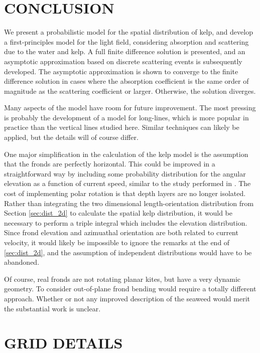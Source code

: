 \documentclass[ms,cpyr,lof,lot]{uathesis}
\begin{document}
 \chapter{CONCLUSION}
\label{chap:conclusion}

We present a probabilistic model for the spatial distribution of kelp, and develop a first-principles model for the light field, considering absorption and scattering due to the water and kelp.
A full finite difference solution is presented, and an asymptotic approximation based on discrete scattering events is subsequently developed.
The asymptotic approximation is shown to converge to the finite difference solution in cases where the absorption coefficient is the same order
of magnitude as the scattering coefficient or larger.
Otherwise, the solution diverges.

Many aspects of the model have room for future improvement.
The most pressing is probably the development of a model for long-lines, which
is more popular in practice than the vertical lines studied here.
Similar techniques can likely be applied, but the details will of course differ.

One major simplification in the calculation of the kelp model
is the assumption that the fronds are perfectly horizontal.
This could be improved in a straightforward way by including some
probability distribution for the angular elevation as a function of current speed,
similar to the study performed in \citep{norvik_design_2017}.
The cost of implementing polar rotation is that depth layers are no longer isolated.
Rather than integrating the two dimensional length-orientation distribution from
Section \ref{sec:dist_2d} to calculate the spatial kelp distribution,
it would be necessary to perform a triple integral which includes the elevation distribution.
Since frond elevation and azimuathal orientation are both related to current velocity,
it would likely be impossible to ignore the remarks at the end of \ref{sec:dist_2d}, and the
assumption of independent distributions would have to be abandoned.

Of course, real fronds are not rotating planar kites, but have a very dynamic geometry.
To consider out-of-plane frond bending would require a totally different approach.
Whether or not any improved description of the seaweed would merit the substantial work is unclear.
 

\chapter{GRID DETAILS}
\label{chap:grid_details}
\end{document}
